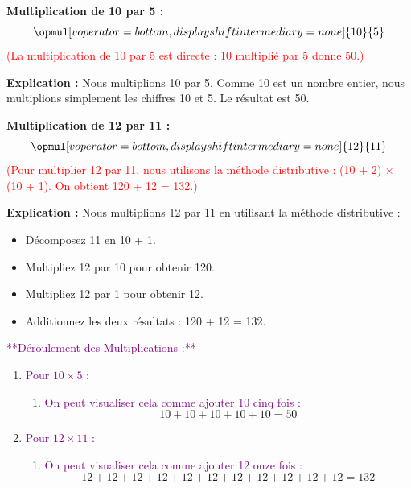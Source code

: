 \documentclass{article}
\begin{document}
\begin{tcolorbox}[colback=orange!10!white, colframe=orange!75!black, sharp corners=south, boxrule=0.8mm, title=Explication des Multiplications]
    \textbf{Multiplication de 10 par 5 :}
    \[
    \opmul[voperator=bottom, displayshiftintermediary=none]{10}{5}
    \]
    \textcolor{red}{(La multiplication de 10 par 5 est directe : 10 multiplié par 5 donne 50.)}
    
    \textbf{Explication :} Nous multiplions 10 par 5. Comme 10 est un nombre entier, nous multiplions simplement les chiffres 10 et 5. Le résultat est 50.

    \textbf{Multiplication de 12 par 11 :}
    \[
    \opmul[voperator=bottom, displayshiftintermediary=none]{12}{11}
    \]
    \textcolor{red}{(Pour multiplier 12 par 11, nous utilisons la méthode distributive : (10 + 2) × (10 + 1). On obtient 120 + 12 = 132.)}
    
    \textbf{Explication :} Nous multiplions 12 par 11 en utilisant la méthode distributive : 
    \begin{itemize}
        \item Décomposez 11 en 10 + 1.
        \item Multipliez 12 par 10 pour obtenir 120.
        \item Multipliez 12 par 1 pour obtenir 12.
        \item Additionnez les deux résultats : 120 + 12 = 132.
    \end{itemize}
\end{tcolorbox}

\vspace{0.4cm}

\textcolor{purple}{**Déroulement des Multiplications :**}

\begin{enumerate}
    \item \textcolor{purple}{Pour \(10 \times 5\) :}
    \begin{enumerate}
        \item \textcolor{purple}{On peut visualiser cela comme ajouter 10 cinq fois :}
        \[
        10 + 10 + 10 + 10 + 10 = 50
        \]
    \end{enumerate}

    \item \textcolor{purple}{Pour \(12 \times 11\) :}
    \begin{enumerate}
        \item \textcolor{purple}{On peut visualiser cela comme ajouter 12 onze fois :}
        \[
        12 + 12 + 12 + 12 + 12 + 12 + 12 + 12 + 12 + 12 + 12 = 132
        \]
    \end{enumerate}
\end{enumerate}
\end{document}
